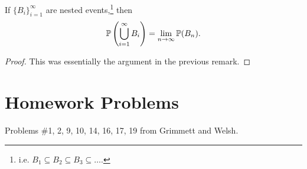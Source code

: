 \begin{theorem}
  If $\{B_i\}_{i = 1}^\infty$ are nested events,\footnote{i.e. $B_1 \subseteq B_2 \subseteq B_3 \subseteq \dots$.}
  then
  \[
    \mathbb{P}\left(\bigcup_{i = 1}^\infty B_i\right)
    = \lim_{n \to \infty} \mathbb{P}(B_n).
  \]
\end{theorem}

\begin{proof}
  This was essentially the argument in the previous
  remark.
\end{proof}

\section{Homework Problems}

Problems \#1, 2, 9, 10, 14, 16, 17, 19 from Grimmett and Welsh.
